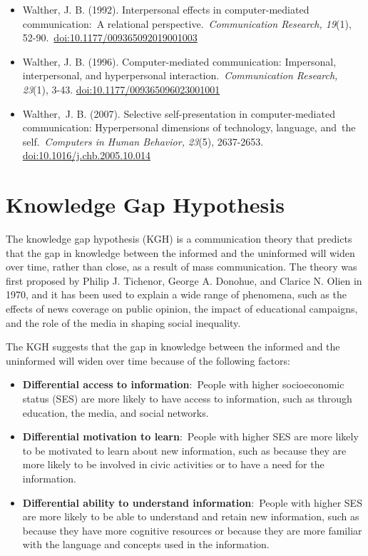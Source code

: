\documentclass[
  b5paper]{book}
\begin{document}
\begin{itemize}
\item
  Walther, J. B. (1992). Interpersonal effects in computer-mediated communication:~A relational perspective.~\emph{Communication Research, 19}(1), 52-90.~\url{doi:10.1177/009365092019001003}
\item
  Walther, J. B. (1996). Computer-mediated communication: Impersonal, interpersonal, and hyperpersonal interaction.~\emph{Communication Research, 23}(1), 3-43. \url{doi:10.1177/009365096023001001}
\item
  Walther,~J. B. (2007). Selective self-presentation in computer-mediated communication: Hyperpersonal dimensions of technology, language, and~the self.~\emph{Computers in Human Behavior, 23}(5), 2637-2653. \url{doi:10.1016/j.chb.2005.10.014}
\end{itemize}

\hypertarget{knowledge-gap-hypothesis}{%
\section{Knowledge Gap Hypothesis}\label{knowledge-gap-hypothesis}}

The knowledge gap hypothesis (KGH) is a communication theory that predicts that the gap in knowledge between the informed and the uninformed will widen over time, rather than close, as a result of mass communication. The theory was first proposed by Philip J. Tichenor, George A. Donohue, and Clarice N. Olien in 1970, and it has been used to explain a wide range of phenomena, such as the effects of news coverage on public opinion, the impact of educational campaigns, and the role of the media in shaping social inequality.

The KGH suggests that the gap in knowledge between the informed and the uninformed will widen over time because of the following factors:

\begin{itemize}
\item
  \textbf{Differential access to information}:~People with higher socioeconomic status (SES) are more likely to have access to information, such as through education, the media, and social networks.
\item
  \textbf{Differential motivation to learn}:~People with higher SES are more likely to be motivated to learn about new information, such as because they are more likely to be involved in civic activities or to have a need for the information.
\item
  \textbf{Differential ability to understand information}:~People with higher SES are more likely to be able to understand and retain new information, such as because they have more cognitive resources or because they are more familiar with the language and concepts used in the information.
\end{itemize}
\end{document}
